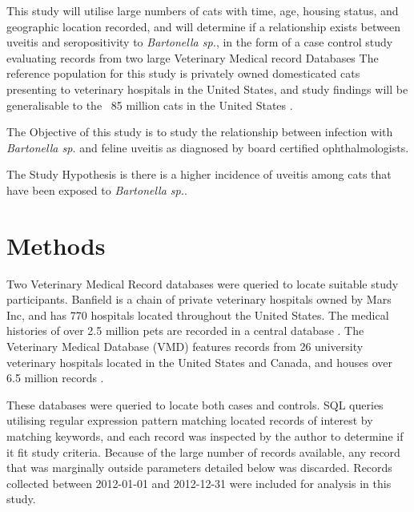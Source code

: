 \documentclass[11pt,twocolumn]{article}
\begin{document}
		This study will utilise large numbers of cats with time, age, housing status, and geographic location recorded, and will determine if a relationship exists between uveitis and seropositivity to  \emph{Bartonella sp.}, in the form of a case control study evaluating records from two large Veterinary Medical record Databases \cite{bark12,UniversityVeterinary}	
		The reference population for this study is privately owned domesticated cats presenting to veterinary hospitals in the United States, and study findings will be generalisable to the ~85 million cats in the United States \cite{HSUSown}.
		

			The Objective of this study is to study the relationship between infection with \emph{Bartonella sp.} and feline uveitis as diagnosed by board certified ophthalmologists.


			The Study Hypothesis is there is a higher incidence of uveitis among cats that have been exposed to \emph{Bartonella sp.}.
\section{Methods}
	Two Veterinary Medical Record databases were queried to locate suitable study participants.
	Banfield is a chain of private veterinary hospitals owned by Mars Inc, and has 770 hospitals located throughout the United States.
	The medical histories of over 2.5 million pets are recorded in a central database \cite{bark12}.
	The Veterinary Medical Database (VMD) features records from 26 university veterinary hospitals located in the United States and Canada, and houses over 6.5 million records \cite{UniversityVeterinary}.
	

	These databases were queried to locate both cases and controls. SQL queries utilising regular expression pattern matching located records of interest by matching keywords, and each record was inspected by the author to determine if it fit study criteria. Because of the large number of records available, any record that was marginally outside parameters detailed below was discarded.
	Records collected between 2012-01-01 and 2012-12-31 were included for analysis in this study.
\end{document}
